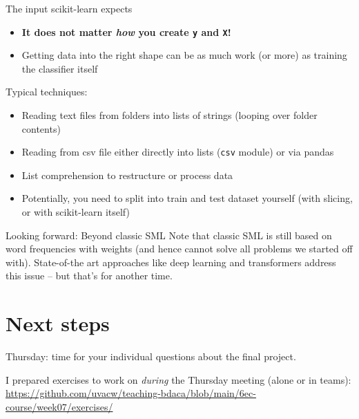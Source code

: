 \begin{frame}{The input scikit-learn expects}
	\begin{itemize}
		\item \textbf{It does not matter \emph{how} you create \texttt{y} and \texttt{X}!}
		\item Getting data into the right shape can be as much work (or more) as training the classifier itself
	\end{itemize}
	\pause
	Typical techniques:
	\begin{itemize}
		\item Reading text files from folders into lists of strings (looping over folder contents)
		\item Reading from csv file either directly into lists (\texttt{csv} module) or via pandas
		\item List comprehension to restructure or process data
		\item Potentially, you need to split into train and test dataset yourself (with slicing, or  with scikit-learn itself)
	\end{itemize}
\end{frame}


\begin{frame}{Looking forward: Beyond classic SML}
Note that classic SML is still based on word frequencies with weights (and hence cannot solve all problems we started off with). State-of-the art approaches like deep learning and transformers address this issue -- but that's for another time.
	
\end{frame}



\section{Next steps}

\begin{frame}[standout]
Thursday: time for your individual questions about the final project. 

I prepared exercises to work on \emph{during} the Thursday meeting (alone or in teams):
\large{\url{https://github.com/uvacw/teaching-bdaca/blob/main/6ec-course/week07/exercises/}}
\end{frame}





\begin{frame}
	\printbibliography
\end{frame}





